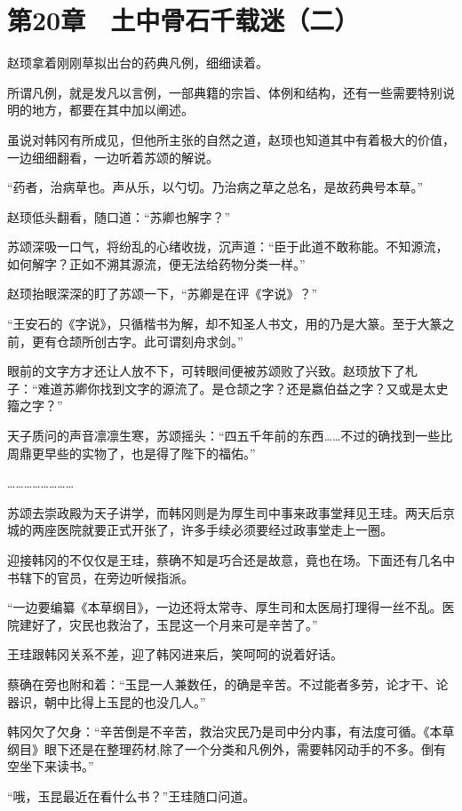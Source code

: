 \section{第20章　土中骨石千载迷（二）}

赵顼拿着刚刚草拟出台的药典凡例，细细读着。

所谓凡例，就是发凡以言例，一部典籍的宗旨、体例和结构，还有一些需要特别说明的地方，都要在其中加以阐述。

虽说对韩冈有所成见，但他所主张的自然之道，赵顼也知道其中有着极大的价值，一边细细翻看，一边听着苏颂的解说。

“药者，治病草也。声从乐，以勺切。乃治病之草之总名，是故药典号本草。”

赵顼低头翻看，随口道：“苏卿也解字？”

苏颂深吸一口气，将纷乱的心绪收拢，沉声道：“臣于此道不敢称能。不知源流，如何解字？正如不溯其源流，便无法给药物分类一样。”

赵顼抬眼深深的盯了苏颂一下，“苏卿是在评《字说》？”

“王安石的《字说》，只循楷书为解，却不知圣人书文，用的乃是大篆。至于大篆之前，更有仓颉所创古字。此可谓刻舟求剑。”

眼前的文字方才还让人放不下，可转眼间便被苏颂败了兴致。赵顼放下了札子：“难道苏卿你找到文字的源流了。是仓颉之字？还是嬴伯益之字？又或是太史籀之字？”

天子质问的声音凛凛生寒，苏颂摇头：“四五千年前的东西……不过的确找到一些比周鼎更早些的实物了，也是得了陛下的福佑。”

……………………

苏颂去崇政殿为天子讲学，而韩冈则是为厚生司中事来政事堂拜见王珪。两天后京城的两座医院就要正式开张了，许多手续必须要经过政事堂走上一圈。

迎接韩冈的不仅仅是王珪，蔡确不知是巧合还是故意，竟也在场。下面还有几名中书辖下的官员，在旁边听候指派。

“一边要编纂《本草纲目》，一边还将太常寺、厚生司和太医局打理得一丝不乱。医院建好了，灾民也救治了，玉昆这一个月来可是辛苦了。”

王珪跟韩冈关系不差，迎了韩冈进来后，笑呵呵的说着好话。

蔡确在旁也附和着：“玉昆一人兼数任，的确是辛苦。不过能者多劳，论才干、论器识，朝中比得上玉昆的也没几人。”

韩冈欠了欠身：“辛苦倒是不辛苦，救治灾民乃是司中分内事，有法度可循。《本草纲目》眼下还是在整理药材,除了一个分类和凡例外，需要韩冈动手的不多。倒有空坐下来读书。”

“哦，玉昆最近在看什么书？”王珪随口问道。

